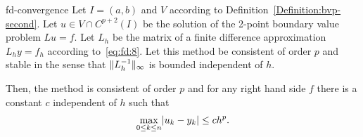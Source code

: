 \begin{Theorem}{fd-convergence}
  Let $I=(a,b)$ and $V$ according to
  Definition~\ref{Definition:bvp-second}. Let $u\in V \cap C^{p+2}(I)$
  be the solution of the 2-point boundary value problem $Lu = f$. Let
  $L_h$ be the matrix of a finite difference approximation $L_h y=f_h$
  according to~\eqref{eq:fd:8}. Let this method be consistent of order
  $p$ and stable in the sense that $\lVert L_h^{-1}\rVert_\infty$ is bounded
  independent of $h$.
  
  Then, the method is consistent of order $p$ and for any right hand
  side $f$ there is a constant $c$ independent of $h$ such that
  \begin{gather}
    \label{eq:fd-convergence:1}
    \max_{0\le k\le n}\lvert u_k - y_k\rvert \le c h^p.
  \end{gather}
\end{Theorem}
